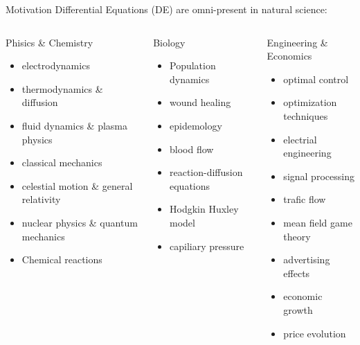 \documentclass[rgb]{beamer}
\begin{document}
    \begin{frame}{Motivation}
        Differential Equations (DE) are omni-present in natural science:
        \begin{columns}
            \begin{column}{0.3\textwidth}
            Phisics \& Chemistry
                \begin{itemize}
                    \item electrodynamics
                    \item thermodynamics \& diffusion
                    \item fluid dynamics \& plasma physics
                    \item classical mechanics
                    \item celestial motion \& general relativity
                    \item nuclear physics \& quantum mechanics
                    \item Chemical reactions
                \end{itemize}
            \end{column}
            \begin{column}{0.3\textwidth}  %
                Biology
                \begin{itemize}
                 \item Population dynamics
                 \item wound healing
                 \item epidemology
                \item blood flow
                \item reaction-diffusion equations
                \item Hodgkin Huxley model
                \item capiliary pressure
                 \end{itemize}
            \end{column}
            \begin{column}{0.3\textwidth}  %
                Engineering \& Economics
                \begin{itemize}
                 \item optimal control
                 \item optimization techniques
                 \item electrial engineering
                \item signal processing
                \item trafic flow
                \item mean field game theory
                \item advertising effects
                \item economic growth
                \item price evolution
                 \end{itemize}
            \end{column}
        \end{columns}
    \end{frame}
    
\end{document}
